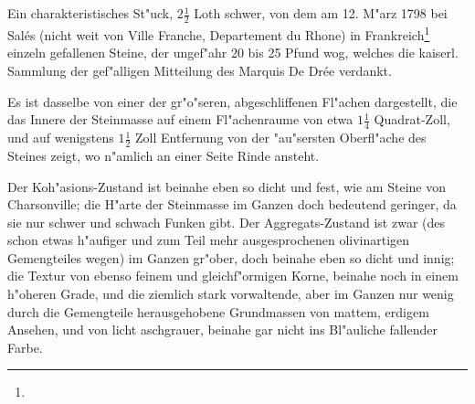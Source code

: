 \documentclass[a4paper, 11pt, oneside, german]{article}
\begin{document}
\subsection{}
\paragraph{}
Ein charakteristisches St"uck, $2\frac{1}{2}$ Loth schwer, von dem am 12. M"arz 1798 bei Salés (nicht weit von Ville Franche, Departement du Rhone) in Frankreich\footnote{} einzeln gefallenen Steine, der ungef"ahr 20 bis 25 Pfund wog, welches die kaiserl. Sammlung der gef"alligen Mitteilung des Marquis De Drée verdankt.

Es ist dasselbe von einer der gr"o"seren, abgeschliffenen Fl"achen dargestellt, die das Innere der Steinmasse auf einem Fl"achenraume von etwa $1\frac{1}{4}$ Quadrat-Zoll, und auf wenigstens $1\frac{1}{2}$ Zoll Entfernung von der "au"sersten Oberfl"ache des Steines zeigt, wo n"amlich an einer Seite Rinde ansteht.

Der Koh"asions-Zustand ist beinahe eben so dicht und fest, wie am Steine von Charsonville; die H"arte der Steinmasse im Ganzen doch bedeutend geringer, da sie nur schwer und schwach Funken gibt. Der Aggregats-Zustand ist zwar (des schon etwas h"aufiger und zum Teil mehr ausgesprochenen olivinartigen Gemengteiles wegen) im Ganzen gr"ober, doch beinahe eben so dicht und innig; die Textur von ebenso feinem und gleichf"ormigen Korne, beinahe noch in einem h"oheren Grade, und die ziemlich stark vorwaltende, aber im Ganzen nur wenig durch die Gemengteile herausgehobene Grundmassen von mattem, erdigem Ansehen, und von licht aschgrauer, beinahe gar nicht ins Bl"auliche fallender Farbe.
\end{document}
